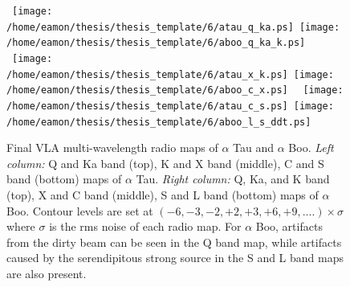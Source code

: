 \begin{figure}[htp]
\centering 
\mbox{
		  \texttt{[image: /home/eamon/thesis/thesis\_template/6/atau\_q\_ka.ps]}
          \texttt{[image: /home/eamon/thesis/thesis\_template/6/aboo\_q\_ka\_k.ps]}
          }
\mbox{
          \texttt{[image: /home/eamon/thesis/thesis\_template/6/atau\_x\_k.ps]}
          \texttt{[image: /home/eamon/thesis/thesis\_template/6/aboo\_c\_x.ps]}
          }
\mbox{
          \texttt{[image: /home/eamon/thesis/thesis\_template/6/atau\_c\_s.ps]}
          \texttt{[image: /home/eamon/thesis/thesis\_template/6/aboo\_l\_s\_ddt.ps]}
          }
\caption[Final VLA multi-wavelength radio maps of $\alpha$ Boo and $\alpha$ Tau]{Final VLA multi-wavelength radio maps of $\alpha$ Tau and $\alpha$ Boo. \textit{Left column:} Q and Ka band (top), K and X band (middle), C and S band (bottom) maps of $\alpha$ Tau. \textit{Right column:} Q, Ka, and K band (top), X and C band (middle), S and L band (bottom) maps of $\alpha$ Boo. Contour levels are set at $(-6,-3,-2,+2,+3,+6,+9,....)\times \sigma$ where $\sigma$ is the rms noise of each radio map. For $\alpha$ Boo, artifacts from the dirty beam can be seen in the Q band map, while artifacts caused by the serendipitous strong source in the S and L band maps are also present.}
\label{fig6.2}
\end{figure}

